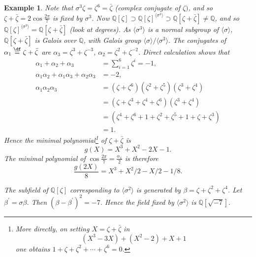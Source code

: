 \documentclass[a4paper,11pt,final,openany]{memoir}
\newtheorem{example}[X]{Example}
\theoremstyle{nonumberplain}
\begin{document}
\begin{example}
Note that $\sigma^{3}\zeta=\zeta^{6}=\bar{\zeta}$ (complex conjugate of
$\zeta)$, and so $\zeta+\bar{\zeta}=2\cos\frac{2\pi}{7}$ is fixed by
$\sigma^{3}$. Now $\mathbb{Q}{}[\zeta]\supset\mathbb{Q}{}[\zeta]^{\langle
\sigma^{3}\rangle}\supset\mathbb{Q}{}[\zeta+\bar{\zeta}]\neq\mathbb{Q}{}$, and
so $\mathbb{Q}{}[\zeta]^{\langle\sigma^{3}\rangle}=\mathbb{Q}{}[\zeta
+\bar{\zeta}]$ (look at degrees). As $\langle{}\sigma^{3}\rangle$ is a normal
subgroup of $\langle{}\sigma\rangle$, $\mathbb{Q}[\zeta+\bar{\zeta}]$ is
Galois over $\mathbb{Q}$, with Galois group $\langle{}\sigma\rangle/\langle
{}\sigma^{3}\rangle.$ The conjugates of $\alpha_{1}%
\overset{\df}{=}\zeta+\bar{\zeta}$ are $\alpha_{3}=\zeta
^{3}+\zeta^{-3}$, $\alpha_{2}=\zeta^{2}+\zeta^{-2}$. Direct calculation shows
that
\begin{align*}
\alpha_{1}+\alpha_{2}+\alpha_{3}  &  =\sum\nolimits_{i=1}^{6}\zeta^{i}=-1,\\
\alpha_{1}\alpha_{2}+\alpha_{1}\alpha_{3}+\alpha_{2}\alpha_{3}  &  =-2,\\
\alpha_{1}\alpha_{2}\alpha_{3}  &  =(\zeta+\zeta^{6})(\zeta^{2}+\zeta
^{5})(\zeta^{3}+\zeta^{4})\\
&  =(\zeta+\zeta^{3}+\zeta^{4}+\zeta^{6})(\zeta^{3}+\zeta^{4})\\
&  =(\zeta^{4}+\zeta^{6}+1+\zeta^{2}+\zeta^{5}+1+\zeta+\zeta^{3})\\
&  =1.
\end{align*}
Hence the minimal polynomial\footnote{More directly, on setting $X=\zeta
+\bar{\zeta}$ in%
\[
(X^{3}-3X)+(X^{2}-2)+X+1
\]
one obtains $1+\zeta+\zeta^{2}+\cdots+\zeta^{6}=0$.} of $\zeta+\bar{\zeta}$
is
\[
g(X)=X^{3}+X^{2}-2X-1.
\]
The minimal polynomial of $\cos\frac{2\pi}{7}=\frac{\alpha_{1}}{2}$ is
therefore
\[
\frac{g(2X)}{8}=X^{3}+X^{2}/2-X/2-1/8.
\]


The subfield of $\mathbb{Q}[\zeta]$ corresponding to $\langle{}\sigma
^{2}\rangle$ is generated by $\beta=\zeta+\zeta^{2}+\zeta^{4}$. Let
$\beta^{\prime}=\sigma\beta$. Then $(\beta-\beta^{\prime})^{2}=-7$. Hence the
field fixed by $\langle{}\sigma^{2}\rangle$ is $\mathbb{Q}[\sqrt{-7}].$
\end{example}
\end{document}
